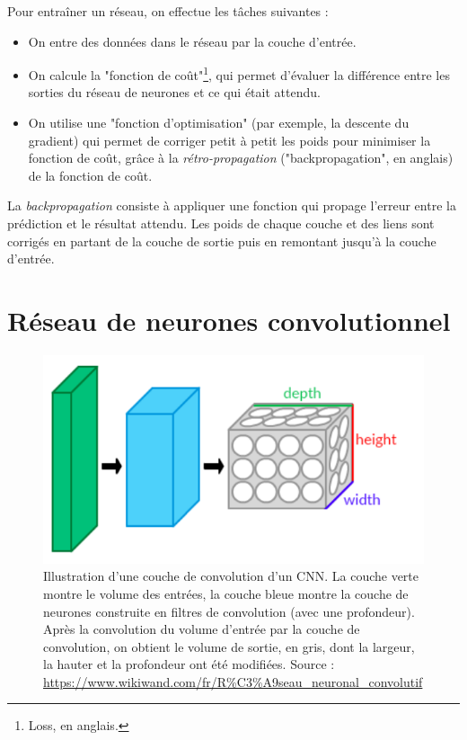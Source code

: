 Pour entraîner un réseau, on effectue les tâches suivantes :
\begin{itemize}
  \item On entre des données dans le réseau par la couche d'entrée.
  \item On calcule  la "fonction de coût"\footnote{Loss, en anglais.}, qui permet d'évaluer la différence entre les sorties du réseau de neurones et ce qui était attendu.
  \item On utilise une "fonction d'optimisation" (par exemple, la descente du gradient) qui permet de corriger petit à petit les poids pour minimiser la fonction de coût, grâce à la \textit{rétro-propagation} ("backpropagation", en anglais) de la fonction de coût.
\end{itemize}

La \textit{backpropagation} consiste à appliquer une fonction qui propage l'erreur entre la prédiction et le résultat attendu. Les poids de chaque couche et des liens sont corrigés en partant de la couche de sortie puis en remontant jusqu'à la couche d'entrée.

\section{Réseau de neurones convolutionnel}

\begin{figure}[!h]
\centering
\includegraphics[scale=0.4]{img/Conv_layers.png}
\caption{Illustration d'une couche de convolution d'un CNN. La couche verte montre le volume des entrées, la couche bleue montre la couche de neurones construite en filtres de convolution (avec une profondeur). Après la convolution du volume d'entrée par la couche de convolution, on obtient le volume de sortie, en gris, dont la largeur, la hauter et la profondeur ont été modifiées. Source : \url{https://www.wikiwand.com/fr/R\%C3\%A9seau_neuronal_convolutif}}
\label{fig:cnn-layer}
\end{figure}

